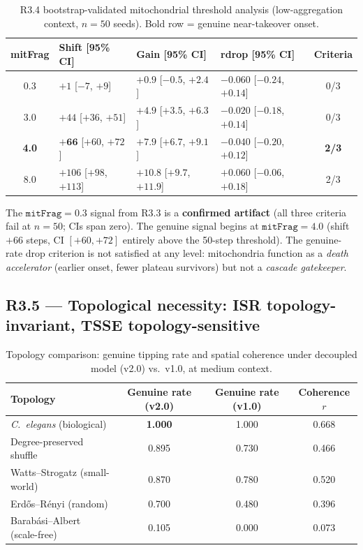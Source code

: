 \documentclass[12pt,a4paper]{article}
\begin{document}
\begin{table}[H]
\centering
\caption{R3.4 bootstrap-validated mitochondrial threshold analysis (low-aggregation context, $n=50$ seeds). Bold row = genuine near-takeover onset.}
\label{tab:r34_mito}
\small
\begin{tabularx}{\textwidth}{cXXXc}
\toprule
\textbf{mitFrag} & \textbf{Shift [95\% CI]} & \textbf{Gain [95\% CI]} &
\textbf{rdrop [95\% CI]} & \textbf{Criteria} \\
\midrule
0.3 & $+1$ [$-7$, $+9$]     & $+0.9$ [$-0.5$, $+2.4$]  & $-0.060$ [$-0.24$, $+0.14$] & 0/3 \\
3.0 & $+44$ [$+36$, $+51$]  & $+4.9$ [$+3.5$, $+6.3$]  & $-0.020$ [$-0.18$, $+0.14$] & 0/3 \\
\textbf{4.0} & $\mathbf{+66}$ [$+60$, $+72$] & $\mathbf{+7.9}$ [$+6.7$, $+9.1$] & $-0.040$ [$-0.20$, $+0.12$] & \textbf{2/3} \\
8.0 & $+106$ [$+98$, $+113$]& $+10.8$ [$+9.7$, $+11.9$]& $+0.060$ [$-0.06$, $+0.18$] & 2/3 \\
\bottomrule
\end{tabularx}
\end{table}

The $\texttt{mitFrag}=0.3$ signal from R3.3 is a \textbf{confirmed artifact} (all three
criteria fail at $n=50$; CIs span zero). The genuine signal begins at $\texttt{mitFrag}=4.0$
(shift $+66$ steps, CI $[+60, +72]$ entirely above the 50-step threshold). The genuine-rate
drop criterion is not satisfied at any level: mitochondria function as a \emph{death
accelerator} (earlier onset, fewer plateau survivors) but not a \emph{cascade gatekeeper}.

\subsection{R3.5 --- Topological necessity: ISR topology-invariant, TSSE topology-sensitive}

\begin{table}[H]
\centering
\caption{Topology comparison: genuine tipping rate and spatial coherence under decoupled model (v2.0) vs.\ v1.0, at medium context.}
\label{tab:r35_topology}
\begin{tabular}{lccc}
\toprule
\textbf{Topology} & \textbf{Genuine rate (v2.0)} & \textbf{Genuine rate (v1.0)} & \textbf{Coherence $r$} \\
\midrule
\textit{C.~elegans} (biological)   & \textbf{1.000} & 1.000 & 0.668 \\
Degree-preserved shuffle           & 0.895          & 0.730 & 0.466 \\
Watts--Strogatz (small-world)      & 0.870          & 0.780 & 0.520 \\
Erd\H{o}s--R\'{e}nyi (random)     & 0.700          & 0.480 & 0.396 \\
Barab\'{a}si--Albert (scale-free)  & 0.105          & 0.000 & 0.073 \\
\bottomrule
\end{tabular}
\end{table}
\end{document}
